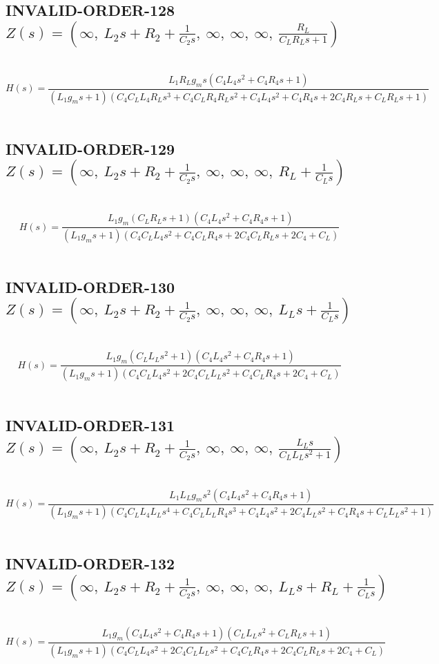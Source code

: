 \documentclass{article}
\begin{document}
\subsection{INVALID-ORDER-128 $Z(s) = \left( \infty, \  L_{2} s + R_{2} + \frac{1}{C_{2} s}, \  \infty, \  \infty, \  \infty, \  \frac{R_{L}}{C_{L} R_{L} s + 1}\right)$ } \ 
\textbf{\[H(s) = \frac{L_{1} R_{L} g_{m} s \left(C_{4} L_{4} s^{2} + C_{4} R_{4} s + 1\right)}{\left(L_{1} g_{m} s + 1\right) \left(C_{4} C_{L} L_{4} R_{L} s^{3} + C_{4} C_{L} R_{4} R_{L} s^{2} + C_{4} L_{4} s^{2} + C_{4} R_{4} s + 2 C_{4} R_{L} s + C_{L} R_{L} s + 1\right)}\] } \ 
\subsection{INVALID-ORDER-129 $Z(s) = \left( \infty, \  L_{2} s + R_{2} + \frac{1}{C_{2} s}, \  \infty, \  \infty, \  \infty, \  R_{L} + \frac{1}{C_{L} s}\right)$ } \ 
\textbf{\[H(s) = \frac{L_{1} g_{m} \left(C_{L} R_{L} s + 1\right) \left(C_{4} L_{4} s^{2} + C_{4} R_{4} s + 1\right)}{\left(L_{1} g_{m} s + 1\right) \left(C_{4} C_{L} L_{4} s^{2} + C_{4} C_{L} R_{4} s + 2 C_{4} C_{L} R_{L} s + 2 C_{4} + C_{L}\right)}\] } \ 
\subsection{INVALID-ORDER-130 $Z(s) = \left( \infty, \  L_{2} s + R_{2} + \frac{1}{C_{2} s}, \  \infty, \  \infty, \  \infty, \  L_{L} s + \frac{1}{C_{L} s}\right)$ } \ 
\textbf{\[H(s) = \frac{L_{1} g_{m} \left(C_{L} L_{L} s^{2} + 1\right) \left(C_{4} L_{4} s^{2} + C_{4} R_{4} s + 1\right)}{\left(L_{1} g_{m} s + 1\right) \left(C_{4} C_{L} L_{4} s^{2} + 2 C_{4} C_{L} L_{L} s^{2} + C_{4} C_{L} R_{4} s + 2 C_{4} + C_{L}\right)}\] } \ 
\subsection{INVALID-ORDER-131 $Z(s) = \left( \infty, \  L_{2} s + R_{2} + \frac{1}{C_{2} s}, \  \infty, \  \infty, \  \infty, \  \frac{L_{L} s}{C_{L} L_{L} s^{2} + 1}\right)$ } \ 
\textbf{\[H(s) = \frac{L_{1} L_{L} g_{m} s^{2} \left(C_{4} L_{4} s^{2} + C_{4} R_{4} s + 1\right)}{\left(L_{1} g_{m} s + 1\right) \left(C_{4} C_{L} L_{4} L_{L} s^{4} + C_{4} C_{L} L_{L} R_{4} s^{3} + C_{4} L_{4} s^{2} + 2 C_{4} L_{L} s^{2} + C_{4} R_{4} s + C_{L} L_{L} s^{2} + 1\right)}\] } \ 
\subsection{INVALID-ORDER-132 $Z(s) = \left( \infty, \  L_{2} s + R_{2} + \frac{1}{C_{2} s}, \  \infty, \  \infty, \  \infty, \  L_{L} s + R_{L} + \frac{1}{C_{L} s}\right)$ } \ 
\textbf{\[H(s) = \frac{L_{1} g_{m} \left(C_{4} L_{4} s^{2} + C_{4} R_{4} s + 1\right) \left(C_{L} L_{L} s^{2} + C_{L} R_{L} s + 1\right)}{\left(L_{1} g_{m} s + 1\right) \left(C_{4} C_{L} L_{4} s^{2} + 2 C_{4} C_{L} L_{L} s^{2} + C_{4} C_{L} R_{4} s + 2 C_{4} C_{L} R_{L} s + 2 C_{4} + C_{L}\right)}\] } \ 
\end{document}
